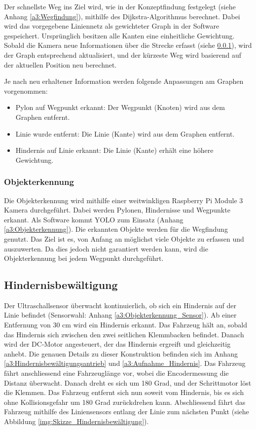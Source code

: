 \documentclass[../main.tex]{subfiles}
\begin{document}
Der schnellste Weg ins Ziel wird, wie in der Konzeptfindung festgelegt (siehe Anhang \ref{a3:Wegfindung}), mithilfe des Dijkstra-Algorithmus berechnet. Dabei wird das vorgegebene Liniennetz als gewichteter Graph in der Software gespeichert. Ursprünglich besitzen alle Kanten eine einheitliche Gewichtung. Sobald die Kamera neue Informationen über die Strecke erfasst (siehe \ref{sub:Objekterkennung}), wird der Graph entsprechend aktualisiert, und der kürzeste Weg wird basierend auf der aktuellen Position neu berechnet.

Je nach neu erhaltener Information werden folgende Anpassungen am Graphen vorgenommen: \begin{itemize} 
  \item Pylon auf Wegpunkt erkannt: Der Wegpunkt (Knoten) wird aus dem Graphen entfernt.
  \item Linie wurde entfernt: Die Linie (Kante) wird aus dem Graphen entfernt. 
  \item Hindernis auf Linie erkannt: Die Linie (Kante) erhält eine höhere Gewichtung.
\end{itemize}

\subsubsection{Objekterkennung} \label{sub:Objekterkennung}
Die Objekterkennung wird mithilfe einer weitwinkligen Raspberry Pi Module 3 Kamera durchgeführt. Dabei werden Pylonen, Hindernisse und Wegpunkte erkannt. Als Software kommt YOLO zum Einsatz (Anhang \ref{a3:Objekterkennung}). Die erkannten Objekte werden für die Wegfindung genutzt. Das Ziel ist es, von Anfang an möglichst viele Objekte zu erfassen und auszuwerten. Da dies jedoch nicht garantiert werden kann, wird die Objekterkennung bei jedem Wegpunkt durchgeführt. 

\subsection{Hindernisbewältigung}
Der Ultraschallsensor überwacht kontinuierlich, ob sich ein Hindernis auf der Linie befindet (Sensorwahl: Anhang \ref{a3:Objekterkennung_Sensor}). Ab einer Entfernung von 30 cm wird ein Hindernis erkannt. Das Fahrzeug hält an, sobald das Hindernis sich zwischen den zwei seitlichen Klemmbacken befindet. Danach wird der DC-Motor angesteuert, der das Hindernis ergreift und gleichzeitig anhebt. Die genauen Details zu dieser Konstruktion befinden sich im Anhang \ref{a3:Hindernisbewältigungsantrieb} und \ref{a3:Aufnahme_Hindernis}.
Das Fahrzeug fährt anschliessend eine Fahrzeuglänge vor, wobei die Encodermessung die Distanz überwacht. Danach dreht es sich um 180 Grad, und der Schrittmotor löst die Klemmen. Das Fahrzeug entfernt sich nun soweit vom Hindernis, bis es sich ohne Kollisionsgefahr um 180 Grad zurückdrehen kann. Abschliessend fährt das Fahrzeug mithilfe des Liniensensors entlang der Linie zum nächsten Punkt (siehe Abbildung \ref{img:Skizze_Hindernisbewältigung}).
\end{document}
